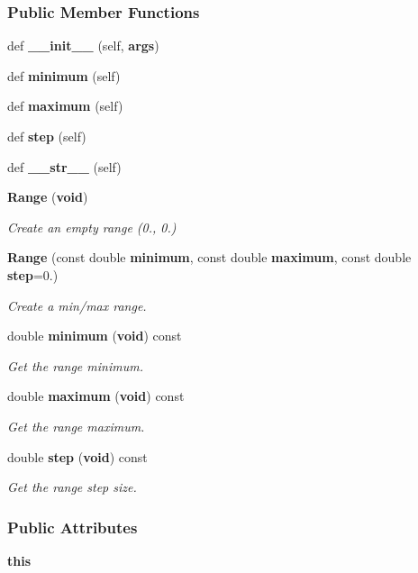 \subsubsection*{Public Member Functions}
\begin{DoxyCompactItemize}
\item 
def {\bf \+\_\+\+\_\+init\+\_\+\+\_\+} (self, {\bf args})
\item 
def {\bf minimum} (self)
\item 
def {\bf maximum} (self)
\item 
def {\bf step} (self)
\item 
def {\bf \+\_\+\+\_\+str\+\_\+\+\_\+} (self)
\item 
{\bf Range} ({\bf void})
\begin{DoxyCompactList}\small\item\em Create an empty range (0., 0.) \end{DoxyCompactList}\item 
{\bf Range} (const double {\bf minimum}, const double {\bf maximum}, const double {\bf step}=0.)
\begin{DoxyCompactList}\small\item\em Create a min/max range. \end{DoxyCompactList}\item 
double {\bf minimum} ({\bf void}) const 
\begin{DoxyCompactList}\small\item\em Get the range minimum. \end{DoxyCompactList}\item 
double {\bf maximum} ({\bf void}) const 
\begin{DoxyCompactList}\small\item\em Get the range maximum. \end{DoxyCompactList}\item 
double {\bf step} ({\bf void}) const 
\begin{DoxyCompactList}\small\item\em Get the range step size. \end{DoxyCompactList}\end{DoxyCompactItemize}
\subsubsection*{Public Attributes}
\begin{DoxyCompactItemize}
\item 
{\bf this}
\end{DoxyCompactItemize}
